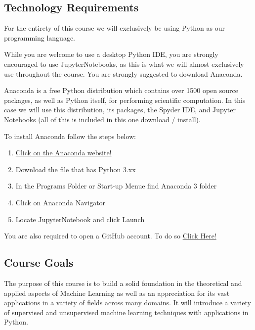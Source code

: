 \documentclass[11pt]{article}
\theoremstyle{plain}
\theoremstyle{definition}
\begin{document}
\subsection{Technology Requirements}

For the entirety of this course we will exclusively be using Python as our programming language. 

\vskip 8pt

While you are welcome to use a desktop Python IDE, you are strongly encouraged to use JupyterNotebooks, as this is what we will almost exclusively use throughout the course. You are strongly suggested to download Anaconda. 

\vskip 8pt

Anaconda is a free Python distribution which contains over 1500 open source packages, as well as Python itself, for performing scientific computation. In this case we will use this distribution, its packages, the Spyder IDE, and Jupyter Notebooks (all of this is included in this one download / install). 

\vskip 8pt

To install Anaconda follow the steps below:

\begin{enumerate}[(1)]
\item \href{https://www.anaconda.com/distribution/}{Click on the Anaconda website!}
\item Download the file that has Python $3$.xx
\item In the Programs Folder or Start-up Menue find Anaconda 3 folder
\item Click on Anaconda Navigator
\item Locate JupyterNotebook and click Launch
\end{enumerate}

You are also required to open a GitHub account. To do so \href{https://github.com/}{Click Here!}

\subsection{Course Goals}

The purpose of this course is to build a solid foundation in the theoretical and applied aspects of Machine Learning as well as an appreciation for its vast applications in a variety of fields across many domains. It will introduce a variety of supervised and unsupervised machine learning techniques with applications in Python.
\end{document}
